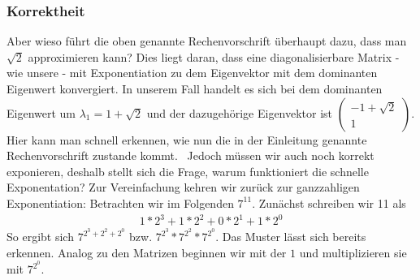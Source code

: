 \documentclass[course=erap]{aspdoc}
\begin{document}
    \subsubsection{Korrektheit}\label{Korrektheit}
    Aber wieso führt die oben genannte Rechenvorschrift überhaupt dazu, dass man $\sqrt{2}$ approximieren kann?
    Dies liegt daran, dass eine diagonalisierbare Matrix - wie unsere - mit Exponentiation zu dem Eigenvektor mit dem dominanten Eigenwert konvergiert. In unserem Fall handelt es sich bei dem dominanten Eigenwert um $\lambda_1 = 1+\sqrt{2}$ und der dazugehörige Eigenvektor ist $\begin{pmatrix}
                                                                                                                                                                                                                                                                                           -1 + \sqrt{2} \\
                                                                                                                                                                                                                                                                                           1
    \end{pmatrix}$.
    Hier kann man schnell erkennen, wie nun die in der Einleitung genannte Rechenvorschrift zustande kommt.~\cite{konvergiert} Jedoch müssen wir auch noch korrekt exponieren, deshalb stellt sich die Frage, warum funktioniert die schnelle Exponentation?
    Zur Vereinfachung kehren wir zurück zur ganzzahligen Exponentiation: Betrachten wir im Folgenden \begin{math}
                                                                                                         7^{11}
    \end{math}. Zunächst schreiben wir 11 als
    \begin{align}
        1*2^3 + 1*2^2 + 0*2^1 + 1*2^0
    \end{align} So ergibt sich \begin{math}
                                   7^{2^3 + 2^2+2^0}
    \end{math} bzw. \begin{math}
                        7^{2^3} * 7^{2^2} * 7^{2^0}
    \end{math}. Das Muster lässt sich bereits erkennen. Analog zu den Matrizen beginnen wir mit der \begin{math}
                                                                                                        1
    \end{math} und multiplizieren sie mit \begin{math}
                                              7^{2^0}
    \end{math}.\cite{blatt}
\end{document}
